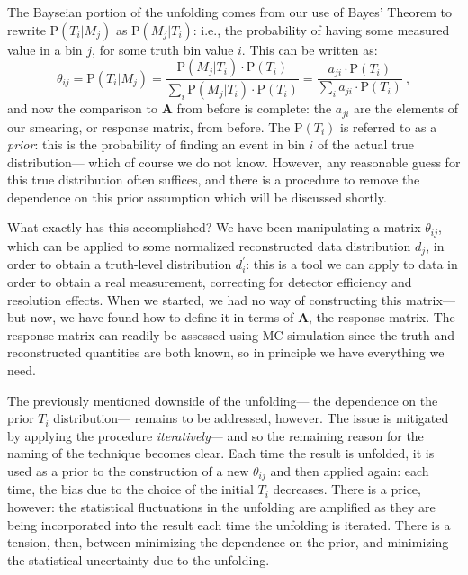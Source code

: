 	The Bayseian portion of the unfolding comes from our use of Bayes' Theorem to rewrite $\mathrm{P}(T_i|M_j)$ as $\mathrm{P}(M_j|T_i)$: i.e., the probability of having some measured value in a bin $j$, for some truth bin value $i$. This can be written as:
%
\begin{equation}
  \theta_{ij} = \mathrm{P}(T_i|M_j) = \frac{\mathrm{P}(M_j|T_i)\cdot \mathrm{P}(T_i)}{\sum_i \mathrm{P}(M_j|T_i)\cdot \mathrm{P}(T_i)} = \frac{a_{ji}\cdot \mathrm{P}(T_i)}{\sum_i a_{ji}\cdot \mathrm{P}(T_i)} \ ,
\end{equation}
%
	and now the comparison to $\mathbf{A}$ from before is complete: the $a_{ji}$ are the elements of our smearing, or response matrix, from before. The $\mathrm{P}(T_i)$ is referred to as a \textit{prior}: this is the probability of finding an event in bin $i$ of the actual true distribution--- which of course we do not know. However, any reasonable guess for this true distribution often suffices, and there is a procedure to remove the dependence on this prior assumption which will be discussed shortly.

	What exactly has this accomplished? We have been manipulating a matrix $\theta_{ij}$, which can be applied to some normalized reconstructed data distribution $d_j$, in order to obtain a truth-level distribution $d^\prime_i$: this is a tool we can apply to data in order to obtain a real measurement, correcting for detector efficiency and resolution effects. When we started, we had no way of constructing this matrix--- but now, we have found how to define it in terms of $\mathbf{A}$, the response matrix. The response matrix can readily be assessed using MC simulation since the truth and reconstructed quantities are both known, so in principle we have everything we need.

	The previously mentioned downside of the unfolding--- the dependence on the prior $T_i$ distribution--- remains to be addressed, however. The issue is mitigated by applying the procedure \textit{iteratively}--- and so the remaining reason for the naming of the technique becomes clear. Each time the result is unfolded, it is used as a prior to the construction of a new $\theta_{ij}$ and then applied again: each time, the bias due to the choice of the initial $T_i$ decreases. There is a price, however: the statistical fluctuations in the unfolding are amplified as they are being incorporated into the result each time the unfolding is iterated. There is a tension, then, between minimizing the dependence on the prior, and minimizing the statistical uncertainty due to the unfolding.

